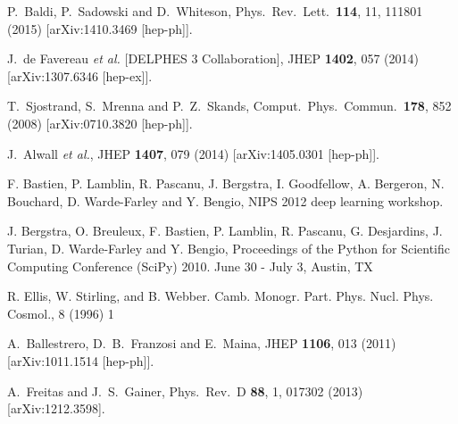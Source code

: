   P.~Baldi, P.~Sadowski and D.~Whiteson,
  Phys.\ Rev.\ Lett.\  {\bf 114}, 11, 111801 (2015)
  [arXiv:1410.3469 [hep-ph]].

  J.~de Favereau {\it et al.} [DELPHES 3 Collaboration],
  JHEP {\bf 1402}, 057 (2014)
  [arXiv:1307.6346 [hep-ex]].

  T.~Sjostrand, S.~Mrenna and P.~Z.~Skands,
  Comput.\ Phys.\ Commun.\  {\bf 178}, 852 (2008)
  [arXiv:0710.3820 [hep-ph]].

  J.~Alwall {\it et al.},
  JHEP {\bf 1407}, 079 (2014)
  [arXiv:1405.0301 [hep-ph]].

F. Bastien, P. Lamblin, R. Pascanu, J. Bergstra, I. Goodfellow, A. Bergeron, N. Bouchard, D. Warde-Farley and Y. Bengio, NIPS 2012 deep learning workshop.

J. Bergstra, O. Breuleux, F. Bastien, P. Lamblin, R. Pascanu, G. Desjardins, J. Turian, D. Warde-Farley and Y. Bengio, Proceedings of the Python for Scientific Computing Conference (SciPy) 2010. June 30 - July 3, Austin, TX


  R. Ellis, W. Stirling, and B. Webber.%
   Camb. Monogr. Part. Phys. Nucl. Phys. Cosmol., 8 (1996) 1

  A.~Ballestrero, D.~B.~Franzosi and E.~Maina,
  JHEP {\bf 1106}, 013 (2011)
  [arXiv:1011.1514 [hep-ph]].

  A.~Freitas and J.~S.~Gainer,
  Phys.\ Rev.\ D {\bf 88}, 1, 017302 (2013)
  [arXiv:1212.3598].

